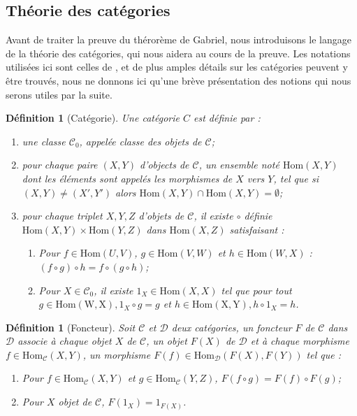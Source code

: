 \documentclass[a4paper,11pt]{article}
\newtheorem{defi}[thm]{Définition}%
\begin{document}
\subsection{Théorie des catégories}
Avant de traiter la preuve du thérorème de Gabriel, nous introduisons le langage de la théorie des catégories, qui nous aidera au cours de la preuve. Les notations utilisées ici sont celles de \cite{A97}, et de plus amples détails sur les catégories peuvent y être trouvés, nous ne donnons ici qu'une brève présentation des notions qui nous serons utiles par la suite.
\begin{defi}[Catégorie]
Une \emph{catégorie} $C$ est définie par :
\begin{enumerate}
\item  une classe $\mathcal C_{0}$, appelée classe des objets de $\mathcal C$;
\item  pour chaque paire $(X,Y)$ d'objects de $\mathcal C$, un ensemble noté $\mathrm{Hom}(X,Y)$ dont les éléments sont appelés les morphismes de $X$ vers $Y$, tel que si $(X,Y) \neq (X',Y')$ alors $\mathrm{Hom}(X,Y) \cap \mathrm{Hom}(X,Y) = \emptyset$;
\item  pour chaque triplet $X,Y,Z$ d'objets de $\mathcal C$, il existe $\circ$ définie $ \mathrm{Hom}(X,Y) \times \mathrm{Hom}(Y,Z)$ dans $ \mathrm{Hom}(X,Z) $ satisfaisant :
  \begin{enumerate}
  \item  Pour $f \in \mathrm{Hom}(U,V)$, $g \in \mathrm{Hom}(V,W)$ et $h \in \mathrm{Hom}(W,X)$ : $(f\circ g) \circ h = f \circ (g \circ h)$;
  \item  Pour $X \in \mathcal C_{0}$, il existe $1_{X} \in \mathrm{Hom}(X,X)$ tel que pour tout $g \in \mathrm{Hom(W,X)}, 1_{X} \circ g = g$ et $h \in \mathrm{Hom(X,Y)}, h \circ 1_{X} = h$.
  \end{enumerate}
\end{enumerate}
\end{defi}
\begin{defi}[Foncteur]
Soit $\mathcal C$ et $\mathcal D$ deux catégories, un \emph{foncteur} $F$ de $\mathcal C$ dans $\mathcal D$ associe à chaque objet $X$ de $\mathcal C$, un objet $F(X)$ de $\mathcal D$ et à chaque morphisme $f \in \mathrm{Hom}_{\mathcal C}(X,Y)$, un morphisme $F(f) \in \mathrm{Hom}_{\mathcal D}(F(X),F(Y))$ tel que : 
    \begin{enumerate}
    \item   Pour $f \in \mathrm{Hom}_{\mathcal C}(X,Y)$ et $g \in \mathrm{Hom}_{\mathcal C}(Y,Z)$, $F(f \circ g) = F(f) \circ F(g)$; \\
        \item  Pour $X$ objet de $\mathcal C$, $F( 1_{X}) =  1_{F(X)}$.
    \end{enumerate}
\end{defi}
\end{document}
